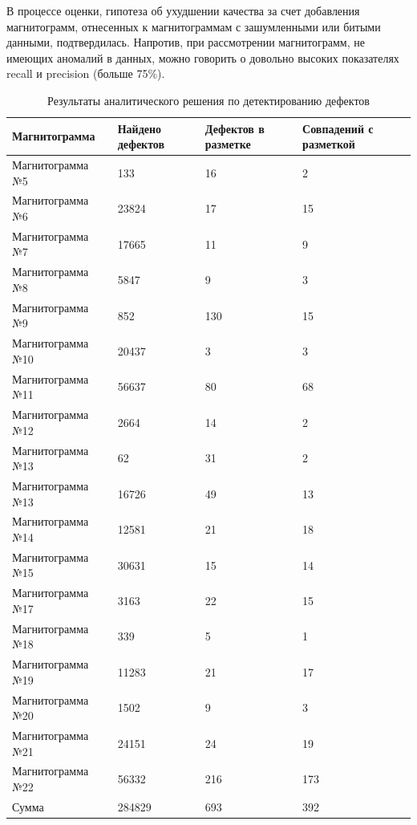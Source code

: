 \documentclass[a4paper,article,14pt]{extarticle}
\begin{document}
В процессе оценки, гипотеза об ухудшении качества за счет добавления магнитограмм, отнесенных к магнитограммам 
с зашумленными или битыми данными, подтвердилась. Напротив, при рассмотрении магнитограмм, не имеющих аномалий 
в данных, можно говорить о довольно высоких показателях recall и precision (больше 75\%).

\begin{center}
    \begin{longtable}{|p{5cm}|p{3cm}|p{3cm}|p{3cm}|}
        \caption{Результаты аналитического решения по детектированию дефектов}\\\hline
        Магнитограмма & Найдено дефектов & Дефектов в разметке & Совпадений с разметкой \\ \hline
        Магнитограмма №5	& 133	& 16	& 2 \\ \hline
        Магнитограмма №6	& 23824	& 17	& 15 \\ \hline
        Магнитограмма №7	& 17665	& 11	& 9 \\ \hline
        Магнитограмма №8	& 5847	& 9	    & 3 \\ \hline
        Магнитограмма №9	& 852	& 130	& 15 \\ \hline
        Магнитограмма №10	& 20437	& 3	    & 3 \\ \hline
        Магнитограмма №11	& 56637	& 80	& 68 \\ \hline
        Магнитограмма №12	& 2664	& 14	& 2 \\ \hline
        Магнитограмма №13	& 62	& 31	& 2 \\ \hline
        Магнитограмма №13	& 16726	& 49	& 13 \\ \hline
        Магнитограмма №14	& 12581	& 21	& 18 \\ \hline
        Магнитограмма №15	& 30631	& 15	& 14 \\ \hline
        Магнитограмма №17	& 3163	& 22	& 15 \\ \hline
        Магнитограмма №18	& 339	& 5	    & 1 \\ \hline
        Магнитограмма №19	& 11283	& 21	& 17 \\ \hline
        Магнитограмма №20	& 1502	& 9	    & 3 \\ \hline
        Магнитограмма №21	& 24151	& 24	& 19 \\ \hline
        Магнитограмма №22	& 56332	& 216	& 173 \\ \hline
        Сумма	& 284829	& 693	& 392 \\ \hline
    \end{longtable}
\end{center}
\end{document}
